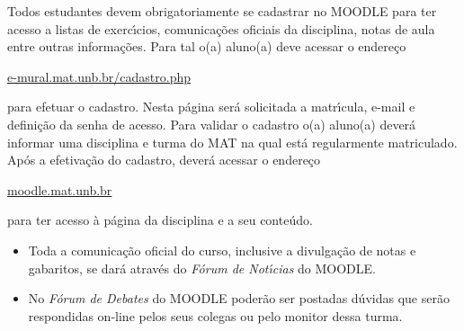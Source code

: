 \documentclass[12pt]{article}
\begin{document}
 Todos estudantes devem
obrigatoriamente se cadastrar no MOODLE para ter acesso a listas de exerc{\'\i}cios, comunica\c{c}\~oes oficiais da disciplina, notas de aula entre outras informa\c{c}\~oes. Para tal o(a) aluno(a) deve acessar o endere\c{c}o
\begin{center}
    \url{e-mural.mat.unb.br/cadastro.php}
\end{center}
 para efetuar o cadastro. Nesta p\'agina ser\'a solicitada a matr{\'\i}cula, e-mail e defini\c{c}\~ao da senha de acesso. Para validar o cadastro o(a) aluno(a) dever\'a informar uma disciplina e turma do MAT na qual est\'a regularmente matriculado. Ap\'os a efetiva\c{c}\~ao do cadastro, dever\'a acessar o endere\c{c}o 
 \begin{center}
     \url{moodle.mat.unb.br}
 \end{center}
  para ter acesso \`a p\'agina da disciplina e a seu conte\'udo.


\begin{itemize}
\item Toda a comunica\c{c}\~{a}o oficial do curso, inclusive a divulga\c{c}\~{a}o de
notas e gabaritos, se dar\'{a} atrav\'{e}s do {\em F\'{o}rum de Not\'{\i}cias} do
MOODLE.\vspace{-0.20cm}
\item No {\em F\'{o}rum de Debates} do MOODLE poder\~{a}o ser
postadas d\'{u}vidas que ser\~{a}o respondidas on-line pelos seus
colegas ou pelo monitor dessa turma.
\end{itemize}

\end{document}
